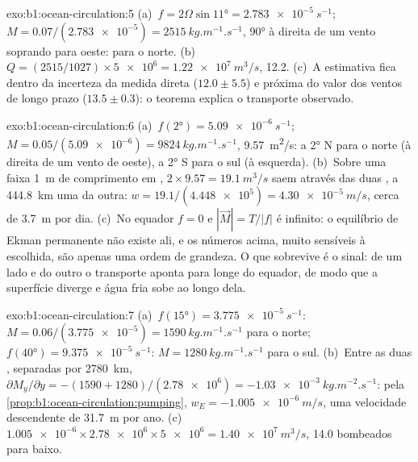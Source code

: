 \begin{solution}{exo:b1:ocean-circulation:5}
(a)~$f = 2\Omega\sin\ang{11} = \qty{2.783e-5}{s^{-1}}$; $M = 0.07/(\num{2.783e-5}) =
\qty{2515}{kg.m^{-1}.s^{-1}}$, \ang{90} à direita de um vento soprando para oeste:
para o norte. (b)~$Q = (2515/1027) \times \num{5e6} = \qty{1.22e7}{m^3/s}$,
\qty{12.2}{\sverdrup}. (c)~A estimativa fica dentro da incerteza da medida direta
($12.0 \pm 5.5$) e próxima do valor dos ventos de longo prazo
($13.5 \pm 0.3$): o teorema explica o transporte observado.
\end{solution}

\begin{solution}{exo:b1:ocean-circulation:6}
(a)~$f(\ang{2}) = \qty{5.09e-6}{s^{-1}}$; $M = 0.05/(\num{5.09e-6}) =
\qty{9824}{kg.m^{-1}.s^{-1}}$, \qty{9.57}{m^2/s}: a \ang{2} N para o norte
(à direita de um vento de oeste), a \ang{2} S para o sul (à esquerda). (b)~Sobre uma faixa
\qty{1}{m} de comprimento em , $2 \times 9.57 = \qty{19.1}{m^3/s}$ saem através das
duas , a \qty{444.8}{km} uma da outra: $w = 19.1/(\num{4.448e5}) = \qty{4.30e-5}{m/s}$,
cerca de \qty{3.7}{m} por dia. (c)~No equador $f = 0$ e $|\vec M| = T/|f|$ é
infinito: o equilíbrio de Ekman permanente não existe ali, e os números acima, muito
sensíveis à  escolhida, são apenas uma ordem de grandeza. O que sobrevive é
o sinal: de um lado e do outro o transporte aponta para longe do equador, de modo que a
superfície diverge e água fria sobe ao longo dela.
\end{solution}

\begin{solution}{exo:b1:ocean-circulation:7}
(a)~$f(\ang{15}) = \qty{3.775e-5}{s^{-1}}$: $M = 0.06/(\num{3.775e-5}) =
\qty{1590}{kg.m^{-1}.s^{-1}}$ para o norte; $f(\ang{40}) =
\qty{9.375e-5}{s^{-1}}$: $M = \qty{1280}{kg.m^{-1}.s^{-1}}$ para o sul.
(b)~Entre as duas , separadas por \qty{2780}{km}, $\partial M_y/\partial y =
-(1590 + 1280)/(\num{2.78e6}) = \qty{-1.03e-3}{kg.m^{-2}.s^{-1}}$: pela
\cref{prop:b1:ocean-circulation:pumping}, $w_E = \qty{-1.005e-6}{m/s}$, uma velocidade
descendente de \qty{31.7}{m} por ano. (c)~$\num{1.005e-6} \times \num{2.78e6} \times
\num{5e6} = \qty{1.40e7}{m^3/s}$, \qty{14.0}{\sverdrup} bombeados para baixo.
\end{solution}

